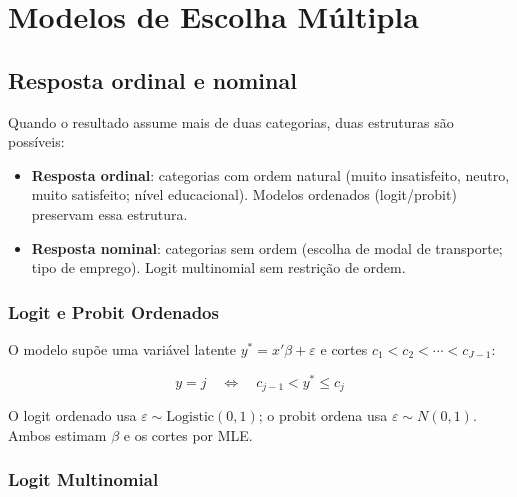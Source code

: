 \chapter{Modelos de Escolha Múltipla}
\label{cap:multinomial}

\section{Resposta ordinal e nominal}

Quando o resultado assume mais de duas categorias, duas estruturas são
possíveis:

\begin{itemize}
  \item \textbf{Resposta ordinal}: categorias com ordem natural (muito insatisfeito,
  neutro, muito satisfeito; nível educacional). Modelos ordenados (logit/probit)
  preservam essa estrutura.
  \item \textbf{Resposta nominal}: categorias sem ordem (escolha de modal de
  transporte; tipo de emprego). Logit multinomial sem restrição de ordem.
\end{itemize}

\subsection*{Logit e Probit Ordenados}

O modelo supõe uma variável latente $y^* = x'\beta + \varepsilon$ e cortes
$c_1 < c_2 < \cdots < c_{J-1}$:

\[
  y = j \quad\Longleftrightarrow\quad c_{j-1} < y^* \leq c_j
\]

O logit ordenado usa $\varepsilon \sim \mathrm{Logistic}(0,1)$; o probit
ordena usa $\varepsilon \sim N(0,1)$. Ambos estimam $\beta$ e os cortes por MLE.

\subsection*{Logit Multinomial}

